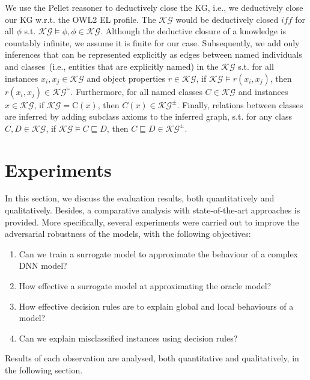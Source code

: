 \hspace*{3.5mm} We use the Pellet reasoner to deductively close the KG, i.e., we deductively close our KG w.r.t. the OWL2 EL profile. The $\mathcal{KG}$ would be deductively closed $iff$ for all $\phi$ s.t. $\mathcal{KG} \models \phi, \phi \in \mathcal{KG}$. Although the deductive closure of a knowledge is countably infinite, we assume it is finite for our case. Subsequently, we add only inferences that can be represented explicitly as edges between named individuals and classes~(i.e., entities that are explicitly named) in the $\mathcal{KG}$ s.t. for all instances $x_{i}, x_{j} \in \mathcal{KG}$ and object properties $r \in \mathcal{KG}$, if $\mathcal{KG} \models r\left(x_{i}, x_{j}\right)$, then $r\left(x_{i}, x_{j}\right) \in \mathcal{KG} ^{\models}$. Furthermore, for all named classes $C \in \mathcal{KG}$ and instances $x \in \mathcal{KG}$, if $\mathcal{KG}=\mathrm{C}(x)$, then $C(x) \in \mathcal{KG} ^{\pm}$. Finally, relations between classes are inferred by adding subclass axioms to the inferred graph, s.t. for any class $C, D \in \mathcal{KG}$, if $\mathcal{KG} \models C \sqsubseteq D$, then $C \sqsubseteq D \in \mathcal{KG}^{\pm}$. 

\section{Experiments}\label{chapter_8:results}
In this section, we discuss the evaluation results, both quantitatively and qualitatively. Besides, a comparative analysis with state-of-the-art approaches is provided. More specifically, several experiments were carried out to improve the adversarial robustness of the models, with the following objectives:

\begin{enumerate}[noitemsep]
    \item Can we train a surrogate model to approximate the behaviour of a complex DNN model? 
    \item How effective a surrogate model at approximating the oracle model?  
    \item How effective decision rules are to explain global and local behaviours of a model?   
    \item Can we explain misclassified instances using decision rules? 
\end{enumerate}

\hspace*{3.5mm} Results of each observation are analysed, both quantitative and qualitatively, in the following section.

